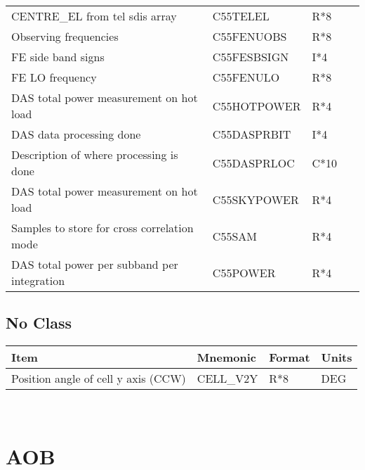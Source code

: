 \begin{tabular}{||l|l|l|l||}
CENTRE\_EL from tel sdis array                     & C55TELEL    & R*8    &  ~    \\      
Observing frequencies                              & C55FENUOBS  & R*8    &  ~    \\      
FE side band signs                                 & C55FESBSIGN & I*4    &  ~    \\      
FE LO frequency                                    & C55FENULO   & R*8    &  ~    \\      
DAS total power measurement on hot load            & C55HOTPOWER & R*4    &  ~    \\      
DAS data processing done                           & C55DASPRBIT & I*4    &  ~    \\      
Description of where processing is done            & C55DASPRLOC & C*10   &  ~    \\      
DAS total power measurement on hot load            & C55SKYPOWER & R*4    &  ~    \\      
Samples to store for cross correlation mode        & C55SAM      & R*4    &  ~    \\      
DAS total power per subband per integration        & C55POWER    & R*4    &  ~    \\ \hline
\end{tabular}
                                                                      

\subsection{No Class}

                    
\begin{tabular}{||l|l|l|l||} \hline
Item                                & Mnemonic  & Format & Units \\ \hline
Position angle of cell y axis (CCW) & CELL\_V2Y & R*8    & DEG   \\ \hline
\end{tabular}
 \\
        

\section{AOB}



